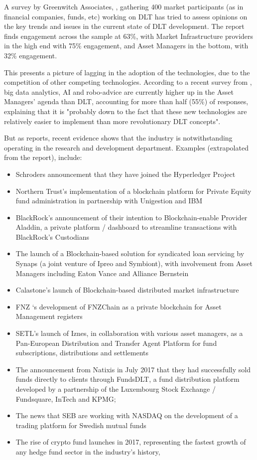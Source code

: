 A survey by Greenwitch Associates, \cite{greenwitchdltreport}, gathering 400 market participants (as in financial companies, funds, etc) working on DLT has tried to assess opinions on the key trends and issues in the current state of DLT development. The report finds engagement across the sample at 63\%, with Market Infrastructure providers in the high end with 75\% engagement, and Asset Managers in the bottom, with 32\% engagement.

This presents a picture of lagging in the adoption of the technologies, due to the competition of other competing technologies. According to a recent survey from \cite{multifundssurvey}, big data analytics, AI and robo-advice are currently higher up in the Asset Managers' agenda than DLT, accounting for more than half (55\%) of responses, explaining that it is "probably down to the fact that these new technologies are relatively easier to implement than more revolutionary DLT concepts". 

But as \cite{ibmdltreport} reports, recent evidence shows that the industry is notwithstanding operating in the research and development department. 
Examples (extrapolated from the report), include:

\begin{itemize}
    \item Schroders announcement that they have joined the Hyperledger Project
    \item Northern Trust’s implementation of a blockchain platform for Private Equity fund administration in partnership with Unigestion and IBM
    \item BlackRock’s announcement of their intention to Blockchain-enable Provider Aladdin, a private platform / dashboard to streamline transactions with BlackRock’s Custodians
    \item The launch of a Blockchain-based solution for syndicated loan servicing by Synaps (a joint venture of Ipreo and Symbiont), with involvement from Asset Managers including Eaton Vance and Alliance Bernstein
    \item Calastone’s launch of Blockchain-based distributed market infrastructure
    \item FNZ ‘s development of FNZChain as a private blockchain for Asset Management registers
    \item SETL’s launch of Iznes, in collaboration with various asset managers, as a Pan-European Distribution and Transfer Agent Platform for fund subscriptions, distributions and
    settlements
    \item The announcement from Natixis in July 2017 that they had successfully sold funds directly to clients through FundsDLT, a fund distribution platform developed by a partnership of the Luxembourg Stock Exchange / Fundsquare, InTech and KPMG;
    \item The news that SEB are working with NASDAQ on the development of a trading platform for Swedish mutual funds
    \item The rise of crypto fund launches in 2017, representing the fastest growth of any hedge fund sector in the industry’s history, \cite{hedgefundcryptoreport}
\end{itemize}
\clearpage

